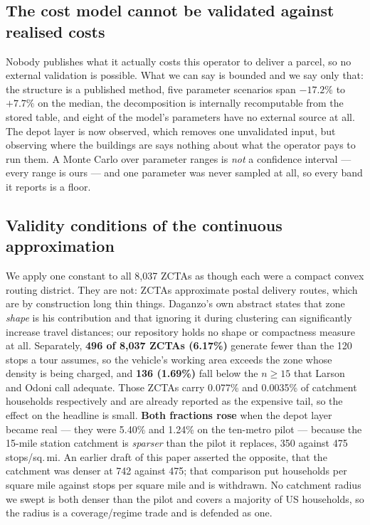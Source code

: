 \documentclass[conference]{IEEEtran}
\begin{document}
\subsection{The cost model cannot be validated against realised costs}

Nobody publishes what it actually costs this operator to deliver a parcel, so
no external validation is possible. What we can say is bounded and we say only
that: the structure is a published method, five parameter scenarios span
$-17.2\%$ to $+7.7\%$ on the median, the decomposition is internally
recomputable from the stored table, and eight of the model's parameters have no
external source at all. The depot layer is now observed, which removes one
unvalidated input, but observing where the buildings are says nothing about
what the operator pays to run them. A Monte Carlo over parameter ranges is \emph{not} a
confidence interval --- every range is ours --- and one parameter was never
sampled at all, so every band it reports is a floor.

\subsection{Validity conditions of the continuous approximation}

We apply one constant to all 8{,}037 ZCTAs as though each were a compact convex
routing district. They are not: ZCTAs approximate postal delivery routes, which
are by construction long thin things. Daganzo's own abstract states that zone
\emph{shape} is his contribution and that ignoring it during clustering can
significantly increase travel distances; our repository holds no shape or
compactness measure at all. Separately, \textbf{496 of 8{,}037 ZCTAs (6.17\%)}
generate fewer than the 120 stops a tour assumes, so the vehicle's working area
exceeds the zone whose density is being charged, and \textbf{136 (1.69\%)} fall
below the $n \geq 15$ that Larson and Odoni call adequate. Those ZCTAs carry
0.077\% and 0.0035\% of catchment households respectively and are already
reported as the expensive tail, so the effect on the headline is small.
\textbf{Both fractions rose} when the depot layer became real --- they were
5.40\% and 1.24\% on the ten-metro pilot --- because the 15-mile station
catchment is \emph{sparser} than the pilot it replaces, 350 against 475
stops/sq.\,mi. An earlier draft of this paper asserted the opposite, that the
catchment was denser at 742 against 475; that comparison put households per
square mile against stops per square mile and is withdrawn. No catchment radius
we swept is both denser than the pilot and covers a majority of US households,
so the radius is a coverage/regime trade and is defended as one.
\end{document}
